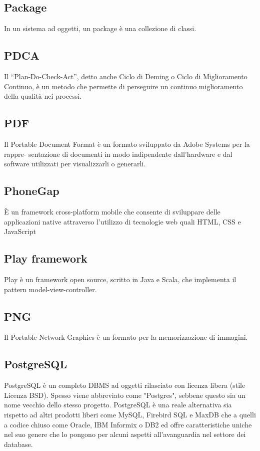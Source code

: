 \subsection*{Package}
In un sistema ad oggetti, un package è una collezione di classi.
 


\subsection*{PDCA}
Il “Plan-Do-Check-Act”, detto anche Ciclo di Deming o Ciclo di Miglioramento Continuo,
è un metodo che permette di perseguire un continuo miglioramento della qualità nei processi.

\subsection*{PDF}
Il Portable Document Format è un formato sviluppato da Adobe Systems per la rappre-
sentazione di documenti in modo indipendente dall’hardware e dal software utilizzati per
visualizzarli o generarli.

\subsection*{PhoneGap}
È un framework cross-platform mobile che consente di sviluppare delle applicazioni native attraverso l'utilizzo di tecnologie web quali HTML, CSS e JavaScript

\subsection*{Play framework}
Play è un framework open source, scritto in Java e Scala, che implementa il pattern model-view-controller.

\subsection*{PNG}
Il Portable Network Graphics è un formato per la memorizzazione di immagini.

\subsection*{PostgreSQL}
PostgreSQL è un completo DBMS ad oggetti rilasciato con licenza libera (stile Licenza BSD). Spesso viene abbreviato come "Postgres", sebbene questo sia un nome vecchio dello stesso progetto. PostgreSQL è una reale alternativa sia rispetto ad altri prodotti liberi come MySQL, Firebird SQL e MaxDB che a quelli a codice chiuso come Oracle, IBM Informix o DB2 ed offre caratteristiche uniche nel suo genere che lo pongono per alcuni aspetti all'avanguardia nel settore dei database.

